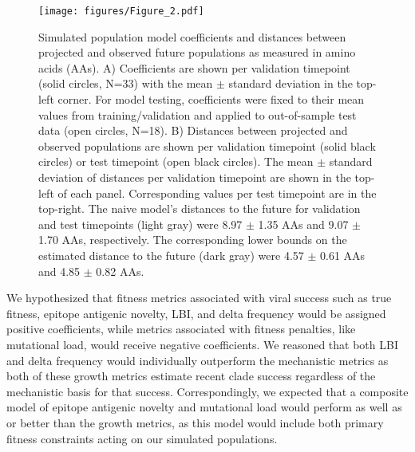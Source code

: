 \documentclass[9pt,lineno]{elife} %
\providecommand{\DIFaddbeginFL}{} %
\providecommand{\DIFaddendFL}{} %
\providecommand{\DIFdelbeginFL}{} %
\providecommand{\DIFdelendFL}{} %
\providecommand{\DIFaddbeginFL}{} %
\providecommand{\DIFaddendFL}{} %
\providecommand{\DIFdelbeginFL}{} %
\providecommand{\DIFdelendFL}{} %
\newcommand{\DIFscaledelfig}{0.5}
\newlength{\DIFdelgraphicswidth} %
\newlength{\DIFdelgraphicsheight} %
\newcommand{\DIFaddincludegraphics}[2][]{{\color{blue}\fbox{\DIFOincludegraphics[#1]{#2}}}} %
\newcommand{\DIFdelincludegraphics}[2][]{%
\sbox{\DIFdelgraphicsbox}{\DIFOincludegraphics[#1]{#2}}%
\settoboxwidth{\DIFdelgraphicswidth}{\DIFdelgraphicsbox} %
\settoboxtotalheight{\DIFdelgraphicsheight}{\DIFdelgraphicsbox} %
\scalebox{\DIFscaledelfig}{%
\parbox[b]{\DIFdelgraphicswidth}{\usebox{\DIFdelgraphicsbox}\\[-\baselineskip] \rule{\DIFdelgraphicswidth}{0em}}\llap{\resizebox{\DIFdelgraphicswidth}{\DIFdelgraphicsheight}{%
\setlength{\unitlength}{\DIFdelgraphicswidth}%
\begin{picture}(1,1)%
\thicklines\linethickness{2pt} %
{\color[rgb]{1,0,0}\put(0,0){\framebox(1,1){}}}%
{\color[rgb]{1,0,0}\put(0,0){\line( 1,1){1}}}%
{\color[rgb]{1,0,0}\put(0,1){\line(1,-1){1}}}%
\end{picture}%
}\hspace*{3pt}}} %
} %
\DeclareRobustCommand{\DIFaddbeginFL}{\DIFOaddbeginFL \let\includegraphics\DIFaddincludegraphics} %
\DeclareRobustCommand{\DIFaddendFL}{\DIFOaddendFL \let\includegraphics\DIFOincludegraphics} %
\DeclareRobustCommand{\DIFdelbeginFL}{\DIFOdelbeginFL \let\includegraphics\DIFdelincludegraphics} %
\DeclareRobustCommand{\DIFdelendFL}{\DIFOaddendFL \let\includegraphics\DIFOincludegraphics} %
\begin{document}
\begin{figure}[htb]
  \begin{center}
  \DIFdelbeginFL %
\DIFdelendFL \DIFaddbeginFL \texttt{[image: figures/Figure\_2.pdf]}
  \DIFaddendFL \caption{
    Simulated population model coefficients and distances between projected and observed future populations as measured in amino acids (AAs).
    A) Coefficients are shown per validation timepoint (solid circles, N=33) with the mean $\pm$ standard deviation in the top-left corner.
    For model testing, coefficients were fixed to their mean values from training/validation and applied to out-of-sample test data (open circles, N=18).
    B) Distances between projected and observed populations are shown per validation timepoint (solid black circles) or test timepoint (open black circles).
    The mean $\pm$ standard deviation of distances per validation timepoint are shown in the top-left of each panel.
    Corresponding values per test timepoint are in the top-right.
    The naive model's distances to the future for validation and test timepoints (light gray) were 8.97 $\pm$ 1.35 AAs and 9.07 $\pm$ 1.70 AAs, respectively.
    The corresponding lower bounds on the estimated distance to the future (dark gray) were 4.57 $\pm$ 0.61 AAs and 4.85 $\pm$ 0.82 AAs.
  }
  \label{fig:unadjusted_model_accuracy_and_coefficients_for_simulated_populations_controls}
  \end{center}
\end{figure}

We hypothesized that fitness metrics associated with viral success such as true fitness, epitope antigenic novelty, LBI, and delta frequency would be assigned positive coefficients, while metrics associated with fitness penalties, like mutational load, would receive negative coefficients.
We reasoned that both LBI and delta frequency would individually outperform the mechanistic metrics as both of these growth metrics estimate recent clade success regardless of the mechanistic basis for that success.
Correspondingly, we expected that a composite model of epitope antigenic novelty and mutational load would perform as well as or better than the growth metrics, as this model would include both primary fitness constraints acting on our simulated populations.
\end{document}

